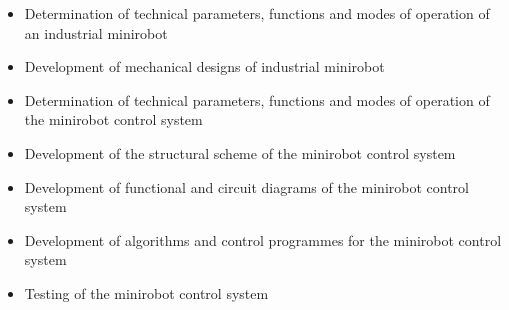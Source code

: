 \begin{itemize}[itemsep=0pt]
    \item Determination of technical parameters, functions and modes of operation of an industrial minirobot
    \item Development of mechanical designs of industrial minirobot 
    \item Determination of technical parameters, functions and modes of operation of the minirobot control system
    \item Development of the structural scheme of the minirobot control system
    \item Development of functional and circuit diagrams of the minirobot control system
    \item Development of algorithms and control programmes for the minirobot control system
    \item Testing of the minirobot control system
\end{itemize}